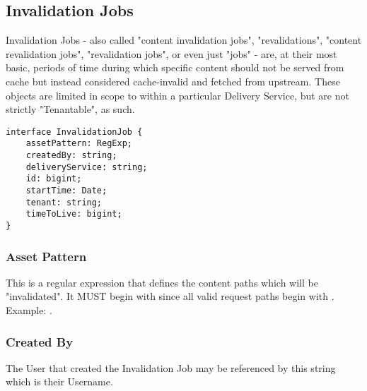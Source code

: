 %
%

\subsection{Invalidation Jobs}
Invalidation Jobs - also called "content invalidation jobs", "revalidations",
"content revalidation jobs", "revalidation jobs", or even just "jobs" - are, at
their most basic, periods of time during which specific content should not be
served from cache but instead considered cache-invalid and fetched from
upstream. These objects are limited in scope to within a particular Delivery
Service, but are not strictly "Tenantable", as such.

\begin{codelisting}
\label{code:datamodel:invalidation-job}
\begin{verbatim}
interface InvalidationJob {
	assetPattern: RegExp;
	createdBy: string;
	deliveryService: string;
	id: bigint;
	startTime: Date;
	tenant: string;
	timeToLive: bigint;
}
\end{verbatim}
\end{codelisting}

\subsubsection{Asset Pattern}
This is a regular expression that defines the content paths which will be
"invalidated". It MUST begin with \code{/} since all valid request paths begin
with \code{/}. Example: .

\subsubsection{Created By}
The User that created the Invalidation Job may be referenced by this string
which is their Username.

